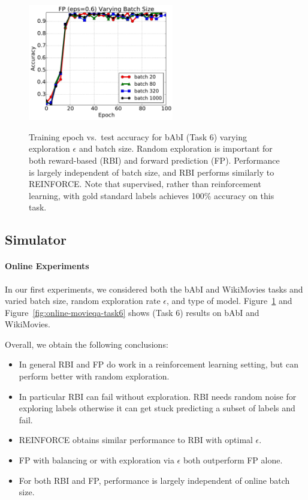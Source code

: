 \begin{figure}[!ht]
\includegraphics[width=2.5in]{img/FPbatch6.pdf}\\
\caption[Training epoch vs.\ test accuracy for bAbI (Task 6) varying exploration $\epsilon$ and batch size.]{  Training epoch vs.\ test accuracy for bAbI (Task 6) varying exploration $\epsilon$ and batch size.
Random exploration is important for both reward-based (RBI) and forward prediction (FP).
Performance is largely independent of batch size, and
RBI performs similarly to REINFORCE. 
Note that supervised, rather than reinforcement learning, with gold standard labels
achieves 100\% accuracy on this task.
\label{fig:online-babi-task6}
}
\end{figure}

\subsection{Simulator}


\paragraph{Online Experiments} \label{sec:online_exp}


In our first experiments, we considered both the bAbI and WikiMovies tasks
and varied batch size, random exploration rate $\epsilon$, and type of model.
Figure~\ref{fig:online-babi-task6} and Figure~\ref{fig:online-movieqa-task6}
shows (Task 6) results on bAbI and WikiMovies.

Overall, we obtain the following conclusions:
\begin{itemize}
\item In general RBI and FP do work in a reinforcement learning setting, but can perform better with random exploration.
\item In particular RBI can fail without exploration. RBI needs random noise for exploring labels otherwise it can get stuck predicting a subset of labels and fail.
\item REINFORCE obtains similar performance to RBI with optimal $\epsilon$. %
\item FP with balancing or with exploration via $\epsilon$ both outperform FP alone.
\item For both RBI and FP, performance is largely independent of online batch size.
\end{itemize}


